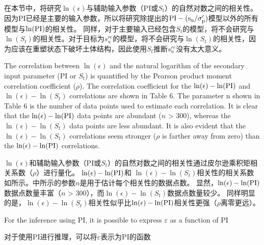 \begin{paracol}{2}
    在本节中，将研究$\ln(\epsilon)$与辅助输入参数（PI或$S_t$）的自然对数之间的相关性。 因为PI已经是主要的输入参数，所以将研究除\citet{Mesri1975409, Mesri1989162}提出的$\rm{PI}-(s_u/\sigma_p')$模型以外的所有模型与$\ln(\rm{PI})$的相关性。 同样，对于主要输入已经包含$S_t$的模型，将不会研究与$\ln(S_t)$的相关性。对于目标为$s_u^{re}$的模型，将不会研究与$\ln(S_t)$的相关性，因为应该在重塑状态下破坏土体结构，因此使用$S_t$推断$s_u^{re}$没有太大意义。

    \switchcolumn*
    

    The correlation between $\ln(\epsilon)$ and the natural logarithm of the secondary input parameter (PI or $S_t$) is quantified by the Pearson product moment correlation coefficient ($\rho$). The correlation coefficient for the $\ln(\epsilon)-\ln(\rm{PI})$ and $\ln(\epsilon)-\ln(S_t)$ correlations are shown in Table 6. The parameter n shown in Table 6 is the number of data points used to estimate each correlation. It is clear that the $\ln(\epsilon)-\ln(\rm{PI})$ data points are abundant ($n$ > 300), whereas the $\ln(\epsilon)-\ln(S_t)$ data points are less abundant. It is also evident that the $\ln(\epsilon)-\ln(S_t)$ correlations seem stronger ($\rho$ is farther away from zero) than the $\ln(\epsilon)-\ln(\rm{PI})$ correlations.

    \switchcolumn

    $\ln(\epsilon)$和辅助输入参数（PI或$S_t$）的自然对数之间的相关性通过皮尔逊乘积矩相关系数（$\rho$）进行量化。 $\ln(\epsilon)-\ln(\rm{PI})$和 $\ln(\epsilon)-\ln(S_t)$相关性的相关系数如所示。中所示的参数$n$是用于估计每个相关性的数据点数。 显然，$\ln(\epsilon)-\ln(\rm{PI})$数据点数量丰富（$n$ > 300），而$\ln(\epsilon)-\ln(S_t)$数据点数量较少。 同样明显的是，$\ln(\epsilon)-\ln(S_t)$相关性似乎比$\ln(\epsilon)-\ln(\rm{PI})$相关性更强（$\rho$离零更远）。

\end{paracol}


\begin{paracol}{2}

    For the inference using PI, it is possible to express $\varepsilon$ as a function of PI

    \switchcolumn

    对于使用PI进行推理，可以将$\varepsilon$表示为PI的函数
\end{paracol}

